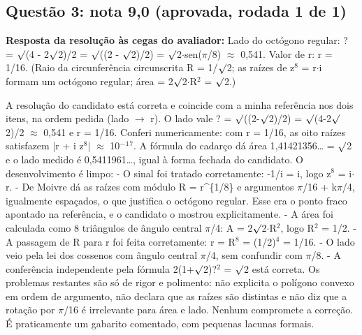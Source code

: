 \documentclass{article}%
\begin{document}
\subsection*{Questão 3: nota 9,0 (aprovada, rodada 1 de 1)}%
\textbf{Resposta da resolução às cegas do avaliador:} Lado do octógono regular: ? = $\surd$(4 - 2$\surd$2)/2 = $\surd$((2 - $\surd$2)/2) = $\surd$2$\cdot$sen($\pi$/8) $\approx$ 0,541. Valor de r: r = 1/16. (Raio da circunferência circunscrita R = 1/$\surd$2; as raízes de z$^{8}$ = r$\cdot$i formam um octógono regular; área = 2$\surd$2$\cdot$R$^2$ = $\surd$2.)\par %
A resolução do candidato está correta e coincide com a minha referência nos dois itens, na ordem pedida (lado $\to$ r). O lado vale ? = $\surd$((2-$\surd$2)/2) = $\surd$(4-2$\surd$2)/2 $\approx$ 0,541 e r = 1/16. Conferi numericamente: com r = 1/16, as oito raízes satisfazem |r + i z$^{8}$| $\approx$ 10$^{-}$$^{1}$$^{7}$. A fórmula do cadarço dá área 1,41421356\ldots{} = $\surd$2 e o lado medido é 0,5411961\ldots{}, igual à forma fechada do candidato.\newline%
\newline%
O desenvolvimento é limpo:\newline%
{-} O sinal foi tratado corretamente: -1/i = i, logo z$^{8}$ = i$\cdot$r.\newline%
{-} De Moivre dá as raízes com módulo R = r\^{}\{1/8\} e argumentos $\pi$/16 + k$\pi$/4, igualmente espaçados, o que justifica o octógono regular. Esse era o ponto fraco apontado na referência, e o candidato o mostrou explicitamente.\newline%
{-} A área foi calculada como 8 triângulos de ângulo central $\pi$/4: A = 2$\surd$2$\cdot$R$^2$, logo R$^2$ = 1/2.\newline%
{-} A passagem de R para r foi feita corretamente: r = R$^{8}$ = (1/2)$^{4}$ = 1/16.\newline%
{-} O lado veio pela lei dos cossenos com ângulo central $\pi$/4, sem confundir com $\pi$/8.\newline%
{-} A conferência independente pela fórmula 2(1+$\surd$2)?$^2$ = $\surd$2 está correta.\newline%
\newline%
Os problemas restantes são só de rigor e polimento: não explicita o polígono convexo em ordem de argumento, não declara que as raízes são distintas e não diz que a rotação por $\pi$/16 é irrelevante para área e lado. Nenhum compromete a correção. É praticamente um gabarito comentado, com pequenas lacunas formais.%
\end{document}
